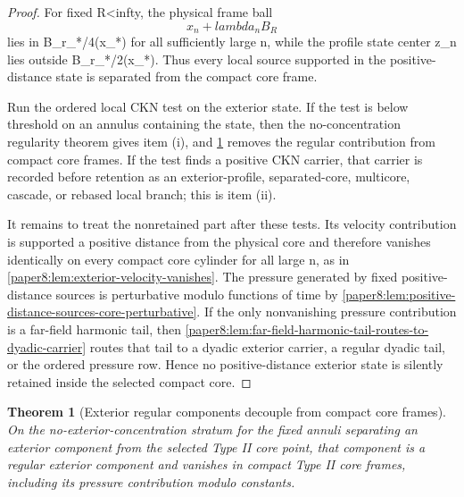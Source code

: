\documentclass[11pt]{amsart}
\def\({}%
\def\){}%
\def\lambda{lambda}%
\def\infty{infty}%
\theoremstyle{plain}
\newtheorem{theorem}{Theorem}[section]
\theoremstyle{definition}
\theoremstyle{remark}
\begin{document}
\begin{proof}
For fixed \(R<\infty\), the physical frame ball
\[
  x_n+\lambda_nB_R
\]
lies in \(B_{r_*/4}(x_*)\) for all sufficiently large \(n\), while the profile
state center \(z_n\) lies outside \(B_{r_*/2}(x_*)\).  Thus every local source
supported in the positive-distance state is separated from the compact core
frame.
\par
Run the ordered local CKN test on the exterior state.  If the test is below
threshold on an annulus containing the state, then the no-concentration
regularity theorem gives item \textup{(i)}, and
\cref{paper8:thm:exterior-regular-removal} removes the regular contribution
from compact core frames.  If the test finds a positive CKN carrier, that
carrier is recorded before retention as an exterior-profile, separated-core,
multicore, cascade, or rebased local branch; this is item \textup{(ii)}.
\par
It remains to treat the nonretained part after these tests.  Its velocity
contribution is supported a positive distance from the physical core and
therefore vanishes identically on every compact core cylinder for all large
\(n\), as in \cref{paper8:lem:exterior-velocity-vanishes}.  The pressure
generated by fixed positive-distance sources is perturbative modulo functions
of time by \cref{paper8:lem:positive-distance-sources-core-perturbative}.  If
the only nonvanishing pressure contribution is a far-field harmonic tail, then
\cref{paper8:lem:far-field-harmonic-tail-routes-to-dyadic-carrier} routes that
tail to a dyadic exterior carrier, a regular dyadic tail, or the ordered
pressure row.  Hence no positive-distance exterior state is silently retained
inside the selected compact core.
\end{proof}

\begin{theorem}[Exterior regular components decouple from compact core frames]
\label{paper8:thm:exterior-regular-removal}
On the no-exterior-concentration stratum for the fixed annuli separating an
exterior component from the selected Type II core point, that component is a
regular exterior component and vanishes in compact Type II core frames,
including its pressure contribution modulo constants.
\end{theorem}
\end{document}
